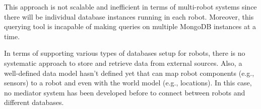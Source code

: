 This approach is not scalable and inefficient in terms of multi-robot systems since there will be individual database instances running in each robot. Moreover, this querying tool is incapable of making queries on multiple MongoDB instances at a time.

In terms of supporting various types of databases setup for robots,  there is no systematic approach to store and retrieve data from external sources. Also, a well-defined data model hasn't defined yet that can map robot components (e.g., sensors) to a robot and even with the world model (e.g., locations). In this case, no mediator system has been developed before to connect between robots and different databases.

